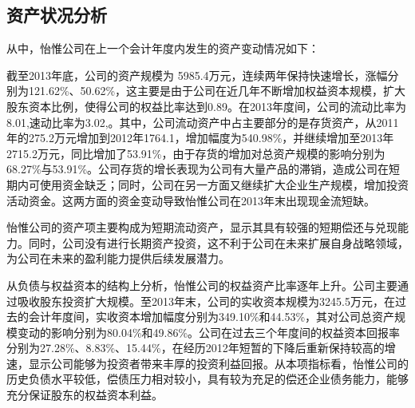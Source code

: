 \subsection{资产状况分析}
从中，怡惟公司在上一个会计年度内发生的资产变动情况如下：
\begin{compactenum}[(1) ]
 \item 截至2013年底，公司的资产规模为 5985.4万元，连续两年保持快速增长，涨幅分别为121.62\%、50.62\%，这主要是由于公司在近几年不断增加权益资本规模，扩大股东资本比例，使得公司的权益比率达到0.89。在2013年度间，公司的流动比率为8.01,速动比率为3.02,。其中，公司流动资产中占主要部分的是存货资产，从2011年的275.2万元增加到2012年1764.1，增加幅度为540.98\%，并继续增加至2013年2715.2万元，同比增加了53.91\%，由于存货的增加对总资产规模的影响分别为68.27\%与53.91\%。公司存货的增长表现为公司有大量产品的滞销，造成公司在短期内可使用资金缺乏；同时，公司在另一方面又继续扩大企业生产规模，增加投资活动资金。这两方面的资金变动导致怡惟公司在2013年末出现现金流短缺。
 \item 怡惟公司的资产项主要构成为短期流动资产，显示其具有较强的短期偿还与兑现能力。同时，公司没有进行长期资产投资，这不利于公司在未来扩展自身战略领域，为公司在未来的盈利能力提供后续发展潜力。
 \item 从负债与权益资本的结构上分析，怡惟公司的权益资产比率逐年上升。公司主要通过吸收股东投资扩大规模。至2013年末，公司的实收资本规模为3245.5万元，在过去的会计年度间，实收资本增加幅度分别为349.10\%和44.53\%，其对公司总资产规模变动的影响分别为80.04\%和49.86\%。公司在过去三个年度间的权益资本回报率分别为27.28\%、8.83\%、15.44\%，在经历2012年短暂的下降后重新保持较高的增速，显示公司能够为投资者带来丰厚的投资利益回报。从本项指标看，怡惟公司的历史负债水平较低，偿债压力相对较小，具有较为充足的偿还企业债务能力，能够充分保证股东的权益资本利益。
\end{compactenum}















